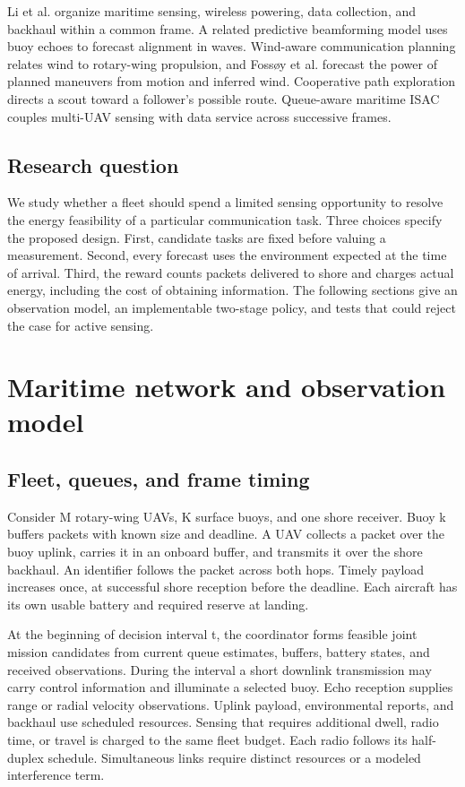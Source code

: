 \documentclass[journal]{IEEEtran}
\begin{document}
Li et al. \cite{r1} organize maritime sensing, wireless powering, data collection, and backhaul within a common frame. A related predictive beamforming model \cite{r2} uses buoy echoes to forecast alignment in waves. Wind-aware communication planning \cite{r3} relates wind to rotary-wing propulsion, and Fossøy et al. \cite{r4} forecast the power of planned maneuvers from motion and inferred wind. Cooperative path exploration \cite{r5} directs a scout toward a follower's possible route. Queue-aware maritime ISAC \cite{r6} couples multi-UAV sensing with data service across successive frames.

\subsection{Research question}
We study whether a fleet should spend a limited sensing opportunity to resolve the energy feasibility of a particular communication task. Three choices specify the proposed design. First, candidate tasks are fixed before valuing a measurement. Second, every forecast uses the environment expected at the time of arrival. Third, the reward counts packets delivered to shore and charges actual energy, including the cost of obtaining information. The following sections give an observation model, an implementable two-stage policy, and tests that could reject the case for active sensing.

\section{Maritime network and observation model}
\subsection{Fleet, queues, and frame timing}
Consider M rotary-wing UAVs, K surface buoys, and one shore receiver. Buoy k buffers packets with known size and deadline. A UAV collects a packet over the buoy uplink, carries it in an onboard buffer, and transmits it over the shore backhaul. An identifier follows the packet across both hops. Timely payload increases once, at successful shore reception before the deadline. Each aircraft has its own usable battery and required reserve at landing.

At the beginning of decision interval t, the coordinator forms feasible joint mission candidates from current queue estimates, buffers, battery states, and received observations. During the interval a short downlink transmission may carry control information and illuminate a selected buoy. Echo reception supplies range or radial velocity observations. Uplink payload, environmental reports, and backhaul use scheduled resources. Sensing that requires additional dwell, radio time, or travel is charged to the same fleet budget. Each radio follows its half-duplex schedule. Simultaneous links require distinct resources or a modeled interference term.
\end{document}
